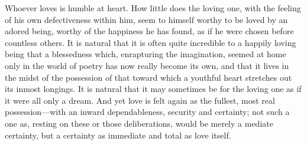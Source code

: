\documentclass[12pt,a4paper]{book}
\begin{document}
Whoever loves is humble at heart. How little does the loving one, with the
feeling of his own defectiveness within him, seem to himself worthy to be
loved by an adored being, worthy of the happiness he has found, as if he
were chosen before countless others. It is natural that it is often quite
incredible to a happily loving being that a blessedness which, enrapturing
the imagination, seemed at home only in the world of poetry has now really
become its own, and that it lives in the midst of the possession of that
toward which a youthful heart stretches out its inmost longings. It is
natural that it may sometimes be for the loving one as if it were all only
a dream. And yet love is felt again as the fullest, most real
possession---with an inward dependableness, security and certainty; not
such a one as, resting on these or those deliberations, would be merely a
mediate certainty, but a certainty as immediate and total as love itself.
\end{document}
